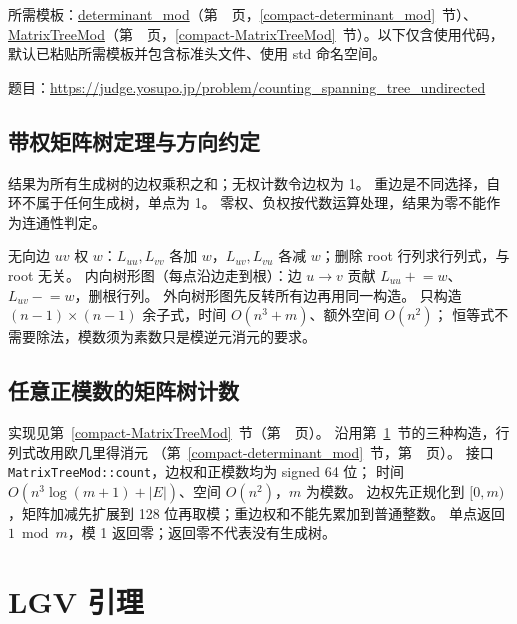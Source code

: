 所需模板：\hyperref[compact-determinant_mod]{determinant\_\allowbreak{}mod}（第~\pageref{compact-determinant_mod}~页，\ref{compact-determinant_mod}~节）、\hyperref[compact-MatrixTreeMod]{MatrixTreeMod}（第~\pageref{compact-MatrixTreeMod}~页，\ref{compact-MatrixTreeMod}~节）。以下仅含使用代码，默认已粘贴所需模板并包含标准头文件、使用 std 命名空间。

题目：\url{https://judge.yosupo.jp/problem/counting_spanning_tree_undirected}



\newpage

\section{带权矩阵树定理与方向约定}\label{knowledge-matrix-tree-weighted}
结果为所有生成树的边权乘积之和；无权计数令边权为 1。
重边是不同选择，自环不属于任何生成树，单点为 1。
零权、负权按代数运算处理，结果为零不能作为连通性判定。

无向边 $uv$ 权 $w$：$L_{uu},L_{vv}$ 各加 $w$，$L_{uv},L_{vu}$ 各减 $w$；删除 root 行列求行列式，与 root 无关。
内向树形图（每点沿边走到根）：边 $u\to v$ 贡献 $L_{uu}\mathrel{+}=w$、$L_{uv}\mathrel{-}=w$，删根行列。
外向树形图先反转所有边再用同一构造。
只构造 $(n-1)\times(n-1)$ 余子式，时间 $O(n^3+m)$、额外空间 $O(n^2)$；
恒等式不需要除法，模数须为素数只是模逆元消元的要求。



\newpage

\section{任意正模数的矩阵树计数}\label{knowledge-matrix-tree-mod}
实现见第~\ref{compact-MatrixTreeMod}~节（第~\pageref{compact-MatrixTreeMod}~页）。
沿用第~\ref{knowledge-matrix-tree-weighted}~节的三种构造，行列式改用欧几里得消元
（第~\ref{compact-determinant_mod}~节，第~\pageref{compact-determinant_mod}~页）。
接口 \texttt{MatrixTreeMod::count}，边权和正模数均为 signed 64 位；
时间 $O(n^3\log(m+1)+|E|)$、空间 $O(n^2)$，$m$ 为模数。
边权先正规化到 $[0,m)$，矩阵加减先扩展到 128 位再取模；重边权和不能先累加到普通整数。
单点返回 $1\bmod m$，模 1 返回零；返回零不代表没有生成树。


\newpage

\Needspace{574pt}

\chapter{LGV 引理}

